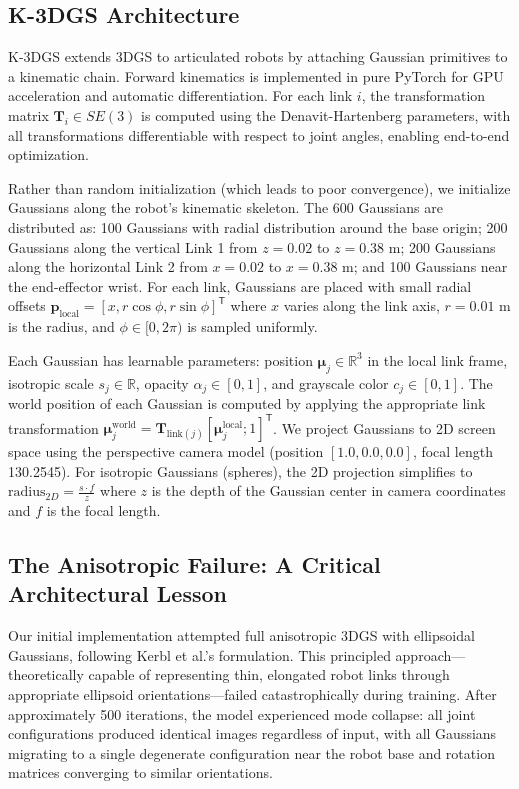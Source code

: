 \documentclass[12pt,a4paper,oneside]{report}
\begin{document}
\subsection{K-3DGS Architecture}
\label{subsec:k_3dgs_architecture}

K-3DGS extends 3DGS to articulated robots by attaching Gaussian primitives to a kinematic chain. Forward kinematics is implemented in pure PyTorch for GPU acceleration and automatic differentiation. For each link $i$, the transformation matrix $\mathbf{T}_i \in SE(3)$ is computed using the Denavit-Hartenberg parameters, with all transformations differentiable with respect to joint angles, enabling end-to-end optimization.

Rather than random initialization (which leads to poor convergence), we initialize Gaussians along the robot's kinematic skeleton. The 600 Gaussians are distributed as: 100 Gaussians with radial distribution around the base origin; 200 Gaussians along the vertical Link 1 from $z=0.02$ to $z=0.38$ m; 200 Gaussians along the horizontal Link 2 from $x=0.02$ to $x=0.38$ m; and 100 Gaussians near the end-effector wrist. For each link, Gaussians are placed with small radial offsets $\mathbf{p}_{\text{local}} = [x, r\cos\phi, r\sin\phi]^\mathsf{T}$ where $x$ varies along the link axis, $r = 0.01$ m is the radius, and $\phi \in [0, 2\pi)$ is sampled uniformly.

Each Gaussian has learnable parameters: position $\boldsymbol{\mu}_j \in \mathbb{R}^3$ in the local link frame, isotropic scale $s_j \in \mathbb{R}$, opacity $\alpha_j \in [0, 1]$, and grayscale color $c_j \in [0, 1]$. The world position of each Gaussian is computed by applying the appropriate link transformation $\boldsymbol{\mu}_j^{\text{world}} = \mathbf{T}_{\text{link}(j)} [\boldsymbol{\mu}_j^{\text{local}}; 1]^\mathsf{T}$. We project Gaussians to 2D screen space using the perspective camera model (position $[1.0, 0.0, 0.0]$, focal length 130.2545). For isotropic Gaussians (spheres), the 2D projection simplifies to $\text{radius}_{2D} = \frac{s \cdot f}{z}$ where $z$ is the depth of the Gaussian center in camera coordinates and $f$ is the focal length.

\subsection{The Anisotropic Failure: A Critical Architectural Lesson}
\label{subsec:the_anisotropic_failure_a_critical_architectural_lesson}

Our initial implementation attempted full anisotropic 3DGS with ellipsoidal Gaussians, following Kerbl et al.'s formulation. This principled approach—theoretically capable of representing thin, elongated robot links through appropriate ellipsoid orientations—failed catastrophically during training. After approximately 500 iterations, the model experienced mode collapse: all joint configurations produced identical images regardless of input, with all Gaussians migrating to a single degenerate configuration near the robot base and rotation matrices converging to similar orientations.
\end{document}
